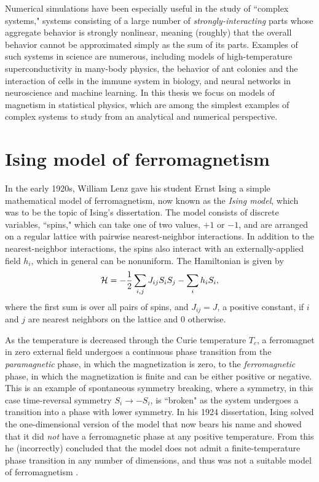 Numerical simulations have been especially useful in the study of ``complex
systems," systems consisting of a large number of \emph{strongly-interacting}
parts whose aggregate behavior is strongly nonlinear, meaning (roughly) that
the overall behavior cannot be approximated simply as the sum of its parts.
Examples of such systems in science are numerous, including models of
high-temperature superconductivity in many-body physics, the behavior of ant
colonies and the interaction of cells in the immune system in biology, and
neural networks in neuroscience and machine learning. In this thesis we focus
on models of magnetism in statistical physics, which are among the simplest
examples of complex systems to study from an analytical and numerical
perspective.


\section{Ising model of ferromagnetism}
\label{sec:intro-ising}

In the early 1920s, William Lenz gave his student Ernst Ising a simple
mathematical model of ferromagnetism, now known as the \emph{Ising model},
which was to be the topic of Ising's dissertation. The model consists of
discrete variables, ``spins," which can take one of two values, $+1$ or $-1$,
and are arranged on a regular lattice with pairwise nearest-neighbor
interactions. In addition to the nearest-neighbor interactions, the spins also
interact with an externally-applied field $h_i$, which in general can be
nonuniform. The Hamiltonian is given by
\begin{equation}
  \mathcal{H} = -\frac{1}{2} \sum_{i,j} J_{ij} S_i S_j - \sum_i h_i S_i,
  \label{eq:ising-ham}
\end{equation}
where the first sum is over all pairs of spins, and $J_{ij}=J$, a positive
constant, if $i$ and $j$ are nearest neighbors on the lattice and 0 otherwise.

As the temperature is decreased through the Curie temperature $T_c$, a
ferromagnet in zero external field undergoes a continuous phase transition from
the \emph{paramagnetic} phase, in which the magnetization is zero, to the
\emph{ferromagnetic} phase, in which the magnetization is finite and can be
either positive or negative. This is an example of spontaneous symmetry
breaking, where a symmetry, in this case time-reversal symmetry $S_i \to -S_i$,
is ``broken" as the system undergoes a transition into a phase with lower
symmetry. In his 1924 dissertation, Ising solved the one-dimensional version
of the model that now bears his name and showed that it did \emph{not} have a
ferromagnetic phase at any positive temperature. From this he (incorrectly)
concluded that the model does not admit a finite-temperature phase transition
in any number of dimensions, and thus was not a suitable model of
ferromagnetism \autocite{ising1925beitrag}.

